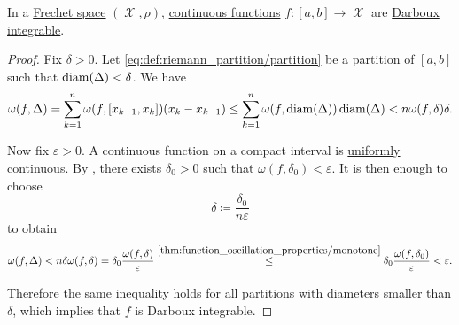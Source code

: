 \begin{proposition}\label{thm:countinuous_functions_integrable}
  In a \hyperref[def:frechet_space]{Frechet space} \( (\mscrX, \rho) \), \hyperref[def:global_continuity]{continuous functions} \( f: [a, b] \to \mscrX \) are \hyperref[def:darboux_integrability]{Darboux integrable}.
\end{proposition}
\begin{proof}
  Fix \( \delta > 0 \). Let \eqref{eq:def:riemann_partition/partition} be a partition of \( [a, b] \) such that \( \operatorname{diam}(\Delta) < \delta \). We have
  \begin{equation*}
    \omega(f, \Delta)
    =
    \sum_{k=1}^n \omega(f, [x_{k-1}, x_k]) (x_k - x_{k-1})
    \leq
    \sum_{k=1}^n \omega(f, \operatorname{diam}(\Delta)) \operatorname{diam}(\Delta)
    <
    n \omega(f, \delta) \delta.
  \end{equation*}

  Now fix \( \varepsilon > 0 \). A continuous function on a compact interval is \hyperref[def:uniform_continuity]{uniformly continuous}. By , there exists \( \delta_0 > 0 \) such that \( \omega(f, \delta_0) < \varepsilon \). It is then enough to choose
  \begin{equation*}
    \delta \coloneqq \frac {\delta_0} {n \varepsilon}
  \end{equation*}
  to obtain
  \begin{equation*}
    \omega(f, \Delta)
    <
    n \delta \omega(f, \delta)
    =
    \delta_0 \frac {\omega(f, \delta)} {\varepsilon}
    \overset {\ref{thm:function_oscillation_properties/monotone}} \leq
    \delta_0 \frac {\omega(f, \delta_0)} {\varepsilon}
    <
    \varepsilon.
  \end{equation*}

  Therefore the same inequality holds for all partitions with diameters smaller than \( \delta \), which implies that \( f \) is Darboux integrable.
\end{proof}

